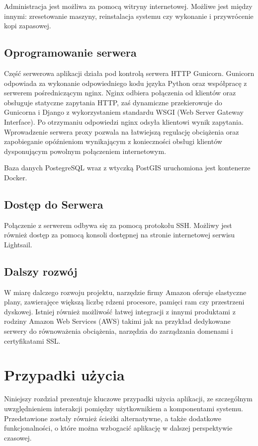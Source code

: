 \documentclass[licencjacka]{pracamgr}
\begin{document}
Administracja jest możliwa za pomocą witryny internetowej. Możliwe jest między innymi: zresetowanie maszyny, reinstalacja systemu czy wykonanie i przywrócenie kopi zapasowej.

\section{Oprogramowanie serwera}

Część serwerowa aplikacji działa pod kontrolą serwera HTTP Gunicorn. Gunicorn odpowiada za wykonanie odpowiedniego kodu języka Python oraz współpracę z serwerem pośredniczącym nginx. Nginx odbiera połączenia od klientów oraz obsługuje statyczne zapytania HTTP, zaś dynamiczne przekierowuje do Gunicorna i Django z wykorzystaniem standardu WSGI (Web Server Gateway Interface). Po otrzymaniu odpowiedzi nginx odsyła klientowi wynik zapytania. Wprowadzenie serwera proxy pozwala na łatwiejszą regulację obciążenia oraz zapobieganie opóźnieniom wynikającym z konieczności obsługi klientów dysponującym powolnym połączeniem internetowym.

Baza danych PostegreSQL wraz z wtyczką PostGIS uruchomiona jest kontenerze Docker.

\section{Dostęp do Serwera}
Połączenie z serwerem odbywa się za pomocą protokołu SSH. Możliwy jest również dostęp za pomocą konsoli dostępnej na stronie internetowej serwisu Lightsail.

\section{Dalszy rozwój}
W miarę dalczego rozwoju projektu, narzędzie firmy Amazon oferuje elastyczne plany, zawierajęce większą liczbę rdzeni procesore, pamięci ram czy przestrzeni dyskowej. Istniej również możliwość łatwej integracji z innymi produktami z rodziny Amazon Web Services (AWS) takimi jak na przykład dedykowane serwery do równoważenia obciążenia, narzędzia do zarządzania domenami i certyfikatami SSL.


\chapter{Przypadki użycia}\label{r:usecase}
Niniejszy rozdział prezentuje kluczowe przypadki użycia aplikacji, ze szczególnym uwzględnieniem interakcji pomiędzy użytkownikiem a komponentami systemu. Przedstawione zostały również ścieżki alternatywne, a także dodatkowe funkcjonalności, o które można wzbogacić aplikację w dalszej perspektywie czasowej.
\end{document}

